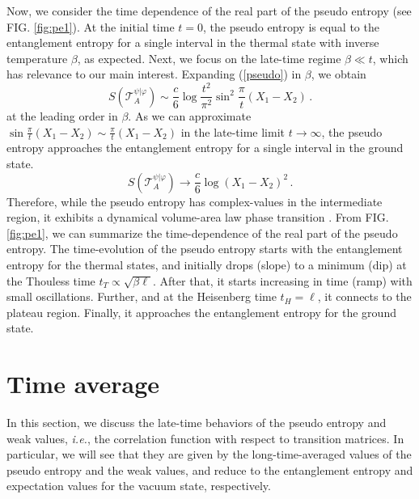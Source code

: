 \documentclass[%
twocolumn, 
secnumarabic,amssymb, preprintnumbers, superscriptaddress, aps, prl]{revtex4-1}
\begin{document}
    Now, we consider the time dependence of the real part of the pseudo entropy (see FIG. \ref{fig:pe1}).  
At the initial time $t=0$, the pseudo entropy is equal to the entanglement entropy for a single interval in the thermal  state with inverse temperature $\beta$, as expected.  Next, we focus on the late-time  regime $\beta\ll t$, which has relevance to our main interest. Expanding (\ref{pseudo}) in $\beta$, we  obtain
 \begin{equation}
    S(\mathcal{T}^{\psi|\varphi}_A)\sim \frac{c}{6}\log \frac{t^2}{\pi^2}\sin^2\frac{\pi}{t}(X_1-X_2)\, .
    \end{equation}
     at the leading order in $\beta$.
    As we can approximate $\sin\frac{\pi}{t}(X_1-X_2)\sim \frac{\pi}{t}(X_1-X_2) $  in the late-time limit $t\rightarrow \infty$, the pseudo entropy approaches the entanglement entropy for a single interval in the ground state.
     \begin{equation}
    S(\mathcal{T}^{\psi|\varphi}_A)\rightarrow \frac{c}{6}\log (X_1-X_2)^2\, .
    \end{equation}
    Therefore, while the pseudo entropy has complex-values in the intermediate region, it  exhibits a dynamical volume-area law phase transition \cite{Chan:2018upn, Li:2018mcv, Skinner:2018tjl}. From FIG. \ref{fig:pe1}, we can summarize the time-dependence of the real part of the pseudo entropy. The time-evolution of the pseudo entropy starts with the entanglement entropy for the thermal states, and initially drops (slope) to a minimum (dip) at the Thouless time $t_T\propto\sqrt{\beta\ell}$. After that, it starts increasing in time (ramp) with small oscillations. Further, and at the Heisenberg time $t_H=\ell$, it connects to the plateau region. Finally, it approaches the entanglement entropy for the ground state. 
\section{Time average}

In this section, we discuss the late-time behaviors of the pseudo entropy and weak values, {\it i.e.}, the correlation function with respect to transition matrices. In particular, we will see that they are given by the long-time-averaged values of the pseudo entropy and the weak values, and reduce to the entanglement entropy and expectation values for the vacuum state, respectively. 
\end{document}
